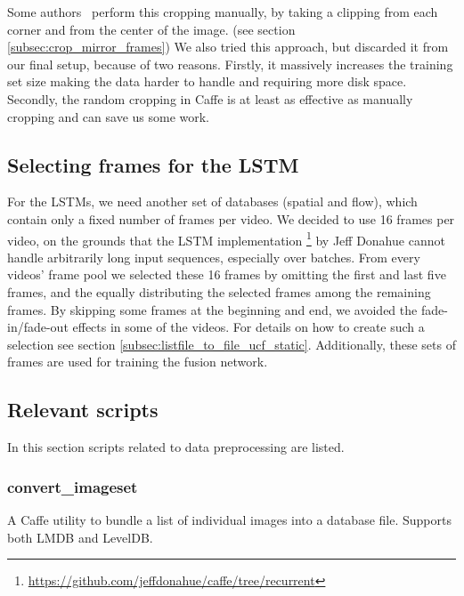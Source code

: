 Some authors~\cite{ye2015evaluating} perform this cropping manually, by taking a clipping from each corner and from the center of the image. (see section \ref{subsec:crop_mirror_frames})
We also tried this approach, but discarded it from our final setup, because of two reasons.
Firstly, it massively increases the training set size making the data harder to handle and requiring more disk space.
Secondly, the random cropping in Caffe is at least as effective as manually cropping and can save us some work.

\subsection{Selecting frames for the LSTM}
For the LSTMs, we need another set of databases (spatial and flow), which contain only a fixed number of frames per video.
We decided to use 16 frames per video, on the grounds that the LSTM implementation \footnote{\url{https://github.com/jeffdonahue/caffe/tree/recurrent}} by Jeff Donahue cannot handle arbitrarily long input sequences, especially over batches.
From every videos' frame pool we selected these 16 frames by omitting the first and last five frames, and the equally distributing the selected frames among the remaining frames.
By skipping some frames at the beginning and end, we avoided the fade-in/fade-out effects in some of the videos.
For details on how to create such a selection see section \ref{subsec:listfile_to_file_ucf_static}.
Additionally, these sets of frames are used for training the fusion network.

\subsection{Relevant scripts}

In this section scripts related to data preprocessing are listed.

\subsubsection{convert\_imageset}
A Caffe utility to bundle a list of individual images into a database file. Supports both LMDB and LevelDB.

